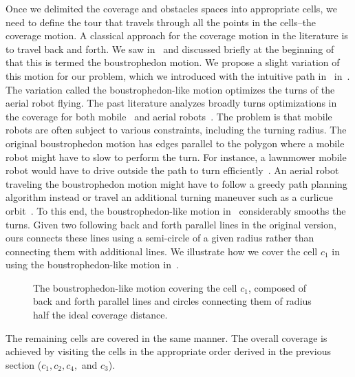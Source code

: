 Once we delimited the coverage and obstacles spaces into appropriate cells, we need to define the tour that travels through all the points in the cells--the coverage motion. A classical approach for the coverage motion in the literature is to travel back and forth. We saw in~ and discussed briefly at the beginning of~ that this is termed the boustrophedon motion. We propose a slight variation of this motion for our problem, which we introduced with the intuitive path in~ in~. The variation called the boustrophedon-like motion optimizes the turns of the aerial robot flying. The past literature analyzes broadly turns optimizations in the coverage for both mobile~\citep{huang2001optimal} and aerial robots~\citep{artemenko2016energy,li2011coverage}. The problem is that mobile robots are often subject to various constraints, including the turning radius. The original boustrophedon motion has edges parallel to the polygon where a mobile robot might have to slow to perform the turn. For instance, a lawnmower mobile robot would have to drive outside the path to turn efficiently~\citep{huang2001optimal}. An aerial robot traveling the boustrophedon motion might have to follow a greedy path planning algorithm instead or travel an additional turning maneuver such as a curlicue orbit~\citep{xu2011optimal,xu2014efficient}. To this end, the boustrophedon-like motion in~ considerably smooths the turns. Given two following back and forth parallel lines in the original version, ours connects these lines using a semi-circle of a given radius rather than connecting them with additional lines. We illustrate how we cover the cell $c_1$ in~ using the boustrophedon-like motion in~. 
\begin{figure}[h]
  \centering
  \selectfont
  
  \caption[Boustrophedon-like motion covering a cell]{The boustrophedon-like motion covering the cell $c_1$, composed of back and forth parallel lines and circles connecting them of radius half the ideal coverage distance.}
  \label{fig:bm}
\end{figure}
The remaining cells are covered in the same manner. The overall coverage is achieved by visiting the cells in the appropriate order derived in the previous section ($c_1,c_2,c_4,$ and $c_3$).

